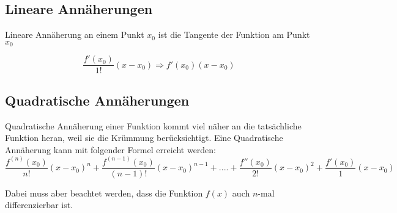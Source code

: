 \documentclass[12pt]{scrartcl}
\begin{document}
\subsection{Lineare Annäherungen}


Lineare Annäherung an einem Punkt $x_0$ ist die Tangente der 
Funktion am Punkt $x_0$

\[ \frac{f'( x_0 )}{1!} ( x - x_0) \Rightarrow f'( x_0 ) ( x - x_0) \] 

\subsection{Quadratische Annäherungen}

Quadratische Annäherung einer Funktion kommt viel näher an die tatsächliche Funktion heran, 
weil sie die Krümmung berücksichtigt. Eine Quadratische Annäherung kann mit folgender Formel
erreicht werden:
\[
    \frac{f^{(n)} ( x_0 )}{n!} ( x - x_0)^n +
    \frac{f^{(n-1)} ( x_0 )}{(n - 1)!} ( x - x_0)^{n - 1} + .... +
    \frac{f'' ( x_0 )}{2!} ( x - x_0)^2 + 
    \frac{f' ( x_0 )}{1} ( x - x_0)
\]

\noindent
Dabei muss aber beachtet werden, dass die Funktion $f(x)$ auch $n$-mal differenzierbar
ist.

% 
\end{document}
